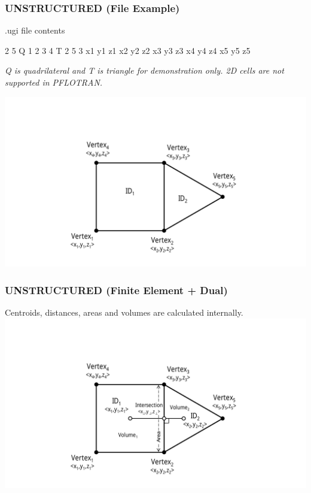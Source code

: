 \documentclass{beamer}
\begin{document}
\begin{frame}\frametitle{UNSTRUCTURED (File Example)}

\begin{minipage}[t]{0.48\linewidth}
\vspace{0.2in}
.ugi file contents
\begin{semiverbatim}
  2 5
  Q 1 2 3 4
  T 2 5 3
  x1 y1 z1
  x2 y2 z2
  x3 y3 z3
  x4 y4 z4
  x5 y5 z5
\end{semiverbatim}
\scriptsize
\vspace{0.1in}
\textit{Q is quadrilateral and T is triangle for demonstration only. 2D cells are not supported in PFLOTRAN.}
\end{minipage}
\hfill
\begin{minipage}[t]{0.48\linewidth}
\vspace{0.01in}
\hspace{-.75in}
\includegraphics[width=1.5\linewidth]{./fe_raw}
\end{minipage}

\end{frame}


\begin{frame}[fragile]\frametitle{UNSTRUCTURED (Finite Element + Dual)}
Centroids, distances, areas and volumes are calculated internally.
\vspace{0.2in}
\centering
\includegraphics[width=1\linewidth]{./fe_all}
\end{frame}
\end{document}
